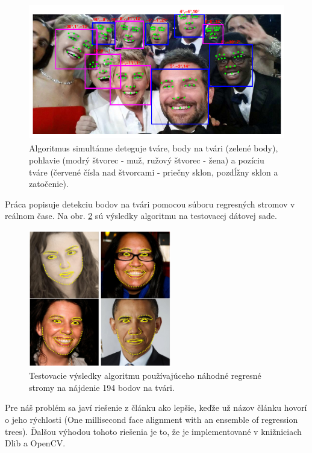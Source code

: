 \begin{figure}[H]
	\begin{center}
		\includegraphics[height=6cm]{pics/pic-ranjan2017hyperface-xichty.png}
		\caption{Algoritmus simultánne deteguje tváre, body na tvári (zelené body), pohlavie (modrý štvorec - muž, ružový štvorec - žena) a pozíciu tváre (červené čísla nad štvorcami - priečny sklon, pozdĺžny sklon a zatočenie).  
		 \cite{ranjan2017hyperface}}
		\label{pic-pic-ranjan2017hyperface-xichty.png}
	\end{center}
\end{figure}

Práca \cite{kazemi2014one} popisuje detekciu bodov na tvári pomocou súboru regresných stromov v reálnom čase. 
Na obr. \ref{pic-oneMsBody.png} sú výsledky algoritmu na testovacej dátovej sade.

\begin{figure}[H]
	\begin{center}
		\includegraphics[height=6cm]{pics/oneMsBody.png}
		\caption{Testovacie výsledky algoritmu používajúceho náhodné regresné stromy na nájdenie 194 bodov na tvári. 
		 \cite{kazemi2014one}}
		\label{pic-oneMsBody.png}
	\end{center}
\end{figure}

Pre náš problém sa javí riešenie z článku \cite{kazemi2014one} ako lepšie, keďže už názov článku hovorí o jeho rýchlosti (One millisecond face alignment with an ensemble of regression trees). 
Ďalšou výhodou tohoto riešenia je to, že je implementované v knižniciach Dlib a OpenCV.

